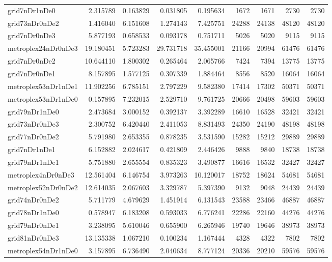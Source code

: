 \begin{longtable}{|l|r|r|r|r|r|r|r|r|}
grid7nDr1nDe0 & 2.315789 & 0.163829 & 0.031805 & 0.195634 & 1672 & 1671 & 2730 & 2730 \\
grid73nDr0nDe2 & 1.416040 & 6.151608 & 1.274143 & 7.425751 & 24288 & 24138 & 48120 & 48120 \\
grid7nDr0nDe3 & 5.877193 & 0.658533 & 0.093178 & 0.751711 & 5026 & 5020 & 9115 & 9115 \\
metroplex24nDr0nDe3 & 19.180451 & 5.723283 & 29.731718 & 35.455001 & 21166 & 20994 & 61476 & 61476 \\
grid7nDr0nDe2 & 10.644110 & 1.800302 & 0.265464 & 2.065766 & 7424 & 7394 & 13775 & 13775 \\
grid7nDr0nDe1 & 8.157895 & 1.577125 & 0.307339 & 1.884464 & 8556 & 8520 & 16064 & 16064 \\
metroplex53nDr1nDe1 & 11.902256 & 6.785151 & 2.797229 & 9.582380 & 17414 & 17302 & 50371 & 50371 \\
metroplex53nDr1nDe0 & 0.157895 & 7.232015 & 2.529710 & 9.761725 & 20666 & 20498 & 59603 & 59603 \\
grid79nDr1nDe0 & 2.473684 & 3.000152 & 0.392137 & 3.392289 & 16610 & 16528 & 32421 & 32421 \\
grid73nDr0nDe3 & 2.300752 & 6.420440 & 2.411053 & 8.831493 & 24350 & 24190 & 48198 & 48198 \\
grid77nDr0nDe2 & 5.791980 & 2.653355 & 0.878235 & 3.531590 & 15282 & 15212 & 29889 & 29889 \\
grid7nDr1nDe1 & 6.152882 & 2.024617 & 0.421809 & 2.446426 & 9888 & 9840 & 18738 & 18738 \\
grid79nDr1nDe1 & 5.751880 & 2.655554 & 0.835323 & 3.490877 & 16616 & 16532 & 32427 & 32427 \\
metroplex4nDr0nDe3 & 12.561404 & 6.146754 & 3.973263 & 10.120017 & 18752 & 18624 & 54681 & 54681 \\
metroplex52nDr0nDe2 & 12.614035 & 2.067603 & 3.329787 & 5.397390 & 9132 & 9048 & 24439 & 24439 \\
grid74nDr0nDe2 & 5.711779 & 4.679629 & 1.451914 & 6.131543 & 23588 & 23466 & 46887 & 46887 \\
grid78nDr1nDe0 & 0.578947 & 6.183208 & 0.593033 & 6.776241 & 22286 & 22160 & 44276 & 44276 \\
grid79nDr0nDe1 & 3.238095 & 5.610046 & 0.655900 & 6.265946 & 19740 & 19646 & 38973 & 38973 \\
grid81nDr0nDe3 & 13.135338 & 1.067210 & 0.100234 & 1.167444 & 4328 & 4322 & 7802 & 7802 \\
metroplex54nDr1nDe0 & 3.157895 & 6.736490 & 2.040634 & 8.777124 & 20336 & 20210 & 59576 & 59576 \\

\end{longtable}
